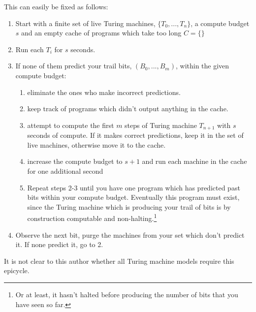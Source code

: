 \documentclass[12pt,authoryear]{elsarticle}
\begin{document}
This can easily be fixed as follows:

\begin{enumerate}
	\item Start with a finite set of live Turing machines, $\{T_0, ..., T_n\}$, a compute budget $s$ and an empty cache of programs which take too long $C =\{\}$
	\item Run each $T_i$ for $s$ seconds. 
	\item If none of them predict your trail bits, $(B_0, ..., B_m)$, within the given compute budget: 
		\begin{enumerate}
		   \item eliminate the ones who make incorrect predictions.
			 \item keep track of programs which didn't output anything in the cache.
			 \item attempt to compute the first $m$ steps of Turing machine $T_{n+1}$ with $s$ seconds of compute. If it makes correct predictions, keep it in the set of live machines, otherwise move it to the cache.
			 \item increase the compute budget to $s + 1$ and run each machine in the cache for one additional second
			 \item Repeat steps 2-3 until you have one program which has predicted past bits within your compute budget. Eventually this program must exist, since the Turing machine which is producing your trail of bits is by construction computable and non-halting.\footnote{Or at least, it hasn't halted before producing the number of bits that you have seen so far.}
		\end{enumerate}
	\item Observe the next bit, purge the machines from your set which don't predict it. If none predict it, go to 2.
\end{enumerate}

It is not clear to this author whether all Turing machine models require this epicycle.
\end{document}

